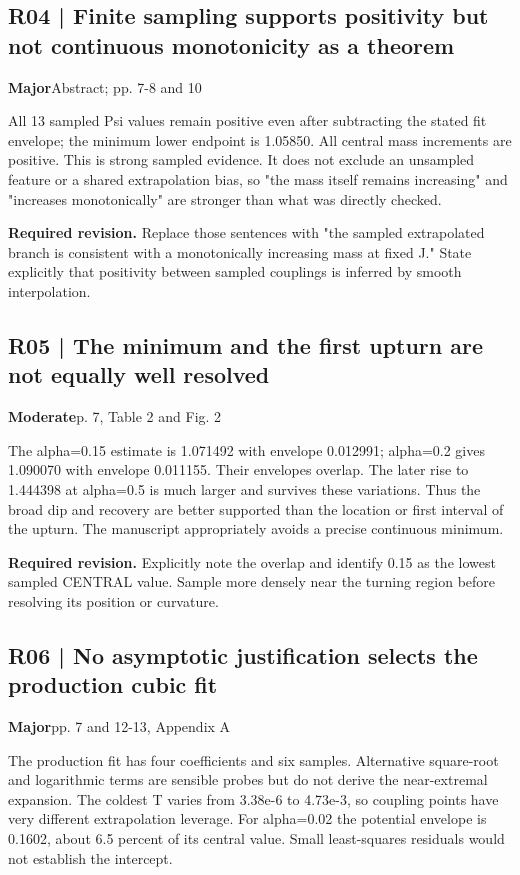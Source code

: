 \documentclass[10pt,a4paper]{article}
\begin{document}
\subsection*{R04 | Finite sampling supports positivity but not continuous monotonicity as a theorem}
\textbf{Major}\quad Abstract; pp. 7-8 and 10

All 13 sampled Psi values remain positive even after subtracting the stated fit envelope; the minimum lower endpoint is 1.05850. All central mass increments are positive. This is strong sampled evidence. It does not exclude an unsampled feature or a shared extrapolation bias, so "the mass itself remains increasing" and "increases monotonically" are stronger than what was directly checked.

\textbf{Required revision.} Replace those sentences with "the sampled extrapolated branch is consistent with a monotonically increasing mass at fixed J." State explicitly that positivity between sampled couplings is inferred by smooth interpolation.

\subsection*{R05 | The minimum and the first upturn are not equally well resolved}
\textbf{Moderate}\quad p. 7, Table 2 and Fig. 2

The alpha=0.15 estimate is 1.071492 with envelope 0.012991; alpha=0.2 gives 1.090070 with envelope 0.011155. Their envelopes overlap. The later rise to 1.444398 at alpha=0.5 is much larger and survives these variations. Thus the broad dip and recovery are better supported than the location or first interval of the upturn. The manuscript appropriately avoids a precise continuous minimum.

\textbf{Required revision.} Explicitly note the overlap and identify 0.15 as the lowest sampled CENTRAL value. Sample more densely near the turning region before resolving its position or curvature.

\subsection*{R06 | No asymptotic justification selects the production cubic fit}
\textbf{Major}\quad pp. 7 and 12-13, Appendix A

The production fit has four coefficients and six samples. Alternative square-root and logarithmic terms are sensible probes but do not derive the near-extremal expansion. The coldest T varies from 3.38e-6 to 4.73e-3, so coupling points have very different extrapolation leverage. For alpha=0.02 the potential envelope is 0.1602, about 6.5 percent of its central value. Small least-squares residuals would not establish the intercept.
\end{document}
